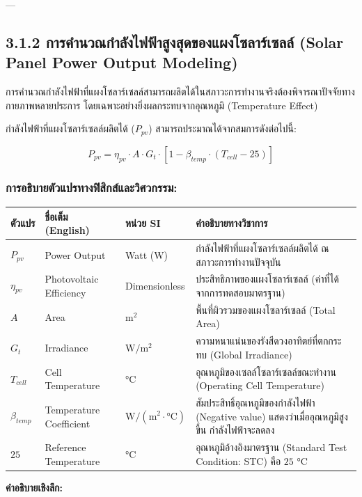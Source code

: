 \documentclass[11pt,a4paper,openany]{report}
\begin{document}
---

\subsection{3.1.2 การคำนวณกำลังไฟฟ้าสูงสุดของแผงโซลาร์เซลล์ (Solar Panel Power Output Modeling)}


การคำนวณกำลังไฟฟ้าที่แผงโซลาร์เซลล์สามารถผลิตได้ในสภาวะการทำงานจริงต้องพิจารณาปัจจัยทางกายภาพหลายประการ โดยเฉพาะอย่างยิ่งผลกระทบจากอุณหภูมิ (Temperature Effect)

กำลังไฟฟ้าที่แผงโซลาร์เซลล์ผลิตได้ ($P_{pv}$) สามารถประมาณได้จากสมการดังต่อไปนี้:

$$P_{pv} = \eta_{pv} \cdot A \cdot G_t \cdot [1 - \beta_{temp} \cdot (T_{cell} - 25)]$$


\subsubsection{การอธิบายตัวแปรทางฟิสิกส์และวิศวกรรม:}


\begin{table}[htbp]
\centering
\begin{tabularx}{\textwidth}{L L L L}
\toprule
ตัวแปร & ชื่อเต็ม (English) & หน่วย SI & คำอธิบายทางวิชาการ \\
\midrule
$P_{pv}$ & Power Output & Watt (W) & กำลังไฟฟ้าที่แผงโซลาร์เซลล์ผลิตได้ ณ สภาวะการทำงานปัจจุบัน \\
$\eta_{pv}$ & Photovoltaic Efficiency & Dimensionless & ประสิทธิภาพของแผงโซลาร์เซลล์ (ค่าที่ได้จากการทดสอบมาตรฐาน) \\
$A$ & Area & $\text{m}^2$ & พื้นที่ผิวรวมของแผงโซลาร์เซลล์ (Total Area) \\
$G_t$ & Irradiance & $\text{W}/\text{m}^2$ & ความหนาแน่นของรังสีดวงอาทิตย์ที่ตกกระทบ (Global Irradiance) \\
$T_{cell}$ & Cell Temperature & $\text{°C}$ & อุณหภูมิของเซลล์โซลาร์เซลล์ขณะทำงาน (Operating Cell Temperature) \\
$\beta_{temp}$ & Temperature Coefficient & $\text{W}/(\text{m}^2 \cdot \text{°C})$ & สัมประสิทธิ์อุณหภูมิของกำลังไฟฟ้า (Negative value) แสดงว่าเมื่ออุณหภูมิสูงขึ้น กำลังไฟฟ้าจะลดลง \\
$25$ & Reference Temperature & $\text{°C}$ & อุณหภูมิอ้างอิงมาตรฐาน (Standard Test Condition: STC) คือ $25 \text{ °C}$ \\
\bottomrule
\end{tabularx}
\end{table}


\textbf{คำอธิบายเชิงลึก:}
\end{document}
